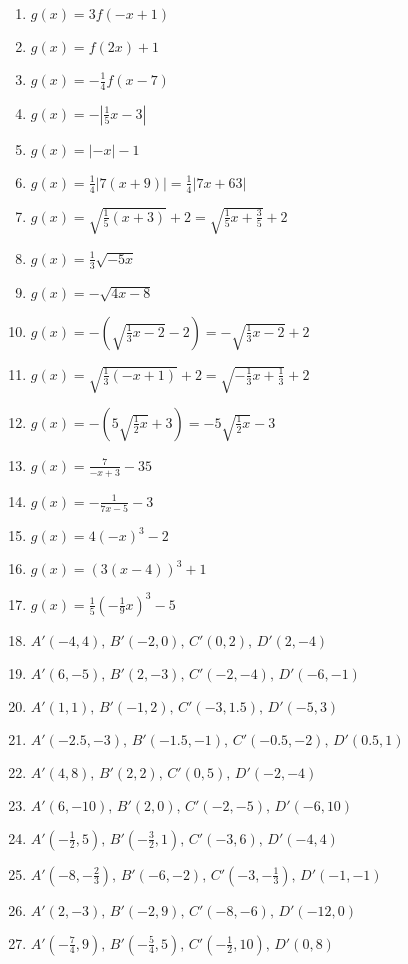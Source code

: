 \begin{enumerate}
	\item $g(x) = 3f(-x+1)$
	\item $g(x) = f(2x)+1$
	\item $g(x) = -\frac{1}{4}f(x-7)$
    \item $g(x) = -\left|\frac{1}{5}x-3\right|$
    \item $g(x) = |-x|-1$
    \item $g(x) = \frac{1}{4}|7(x+9)| = \frac{1}{4}|7x+63|$
    \item $g(x) = \sqrt{\frac{1}{5}(x+3)} + 2 = \sqrt{\frac{1}{5}x + \frac{3}{5}}+2$
    \item $g(x) = \frac{1}{3}\sqrt{-5x}$
    \item $g(x) = -\sqrt{4x-8}$
    \item $g(x) = -\left(\sqrt{\frac{1}{3}x-2}-2\right) = -\sqrt{\frac{1}{3}x-2}+2$
    \item $g(x) = \sqrt{\frac{1}{3}(-x+1)}+2 = \sqrt{-\frac{1}{3}x+\frac{1}{3}}+2$
    \item $g(x) = -\left(5\sqrt{\frac{1}{2}x}+3\right) = -5\sqrt{\frac{1}{2}x} - 3$
    \item $g(x) = \frac{7}{-x+3} - 35$
    \item $g(x) = -\frac{1}{7x-5} - 3$ 
    \item $g(x) = 4(-x)^3 - 2$
    \item $g(x) = \left(3(x-4)\right)^3 + 1$
    \item $g(x) = \frac{1}{5}\left(-\frac{1}{9}x\right)^3 - 5$
    \item $A'(-4,4), \, B'(-2,0), \, C'(0,2), \, D'(2,-4)$
    \item $A'(6,-5), \, B'(2,-3), \, C'(-2, -4), \, D'(-6,-1)$
    \item $A'(1,1), \, B'(-1,2), \, C'(-3,1.5), \, D'(-5,3)$
    \item $A'(-2.5,-3), \, B'(-1.5,-1), \, C'(-0.5,-2), \, D'(0.5,1)$
    \item $A'(4,8), \, B'(2,2), \, C'(0,5), \, D'(-2,-4)$
    \item $A'(6,-10), \, B'(2,0), \, C'(-2,-5), \, D'(-6,10)$
    \item $A'\left(-\frac{1}{2},5\right), \, B'\left(-\frac{3}{2},1\right), \, C'(-3,6), \, D'(-4,4)$
	\item $A'\left(-8,-\frac{2}{3}\right), \, B'(-6,-2), \, C'\left(-3,-\frac{1}{3}\right), \, D'(-1,-1)$
	\item $A'(2,-3), \, B'(-2,9), \, C'(-8,-6), \, D'(-12,0)$
	\item $A'\left(-\frac{7}{4},9\right), \, B'\left(-\frac{5}{4},5\right), \, C'\left(-\frac{1}{2},10\right), \, D'(0,8)$
\end{enumerate}
